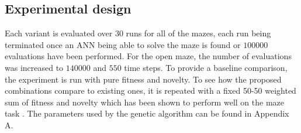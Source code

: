 \subsection{Experimental design}
\label{subsection:design}
Each variant is evaluated over $30$ runs for all of the mazes, each run being terminated once an ANN
being able to solve the maze is found or $100 000$ evaluations have been performed. For the open maze, the number of
evaluations was increased to $140 000$ and $550$ time steps.
To provide a baseline comparison, the experiment is run with pure fitness and novelty. To see how
the proposed combinations compare to existing ones, it is repeated with a fixed 50-50 weighted sum
of fitness and novelty which has been shown to perform well on the maze task \cite{ns_study}.
The parameters used by the genetic algorithm can be found in Appendix A.